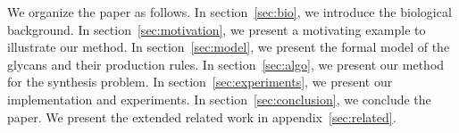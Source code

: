 We organize the paper as follows.
In section~\ref{sec:bio}, we introduce the biological background.
In section~\ref{sec:motivation}, we present a motivating example to illustrate our method.
In section~\ref{sec:model}, we present the formal model of the glycans
and their production rules.
In section~\ref{sec:algo}, we present our method for the synthesis problem.
In section~\ref{sec:experiments}, we present our implementation  and experiments. %
In section~\ref{sec:conclusion}, we conclude the paper.
We present the extended related work in appendix~\ref{sec:related}.



